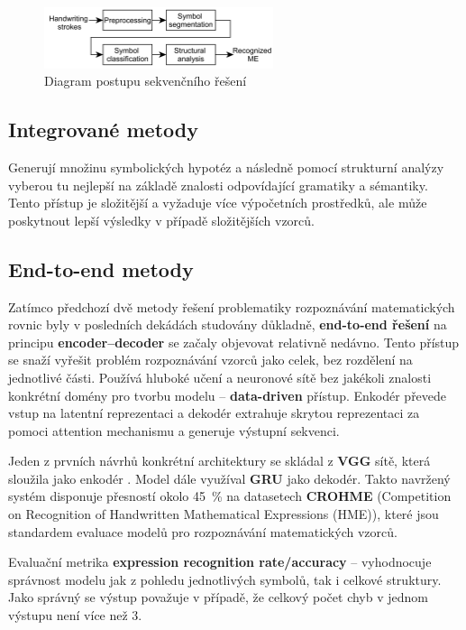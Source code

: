 \begin{figure}[H]
    \centering
    \includegraphics[width=0.6\textwidth]{img/sequential_sol.png}
    \caption{Diagram postupu sekvenčního řešení}
    \label{img:seq_sol}
\end{figure}

\subsection{Integrované metody}
Generují množinu symbolických hypotéz a následně pomocí strukturní analýzy vyberou tu nejlepší na základě znalosti odpovídající gramatiky a sémantiky. Tento přístup je složitější a vyžaduje více výpočetních prostředků, ale může poskytnout lepší výsledky v případě složitějších vzorců.

\subsection{End-to-end metody}
Zatímco předchozí dvě metody řešení problematiky rozpoznávání matematických rovnic byly v posledních dekádách studovány důkladně, \textbf{end-to-end řešení} na principu \textbf{encoder--decoder} se začaly objevovat relativně nedávno. Tento přístup se snaží vyřešit problém rozpoznávání vzorců jako celek, bez rozdělení na jednotlivé části. Používá hluboké učení a neuronové sítě bez jakékoli znalosti konkrétní domény pro tvorbu modelu -- \textbf{data-driven} přístup. Enkodér převede vstup na latentní reprezentaci a dekodér extrahuje skrytou reprezentaci za pomoci attention mechanismu a generuje výstupní sekvenci. 

Jeden z prvních návrhů konkrétní architektury se skládal z \textbf{VGG} sítě, která sloužila jako enkodér \cite{ZHANG_1}. Model dále využíval \textbf{GRU} jako dekodér. Takto navržený systém disponuje přesností okolo 45~\% na datasetech \textbf{CROHME} (Competition on Recognition of Handwritten Mathematical Expressions (HME)), které jsou standardem evaluace modelů pro rozpoznávání matematických vzorců. 

\begin{tcolorbox}[myhighlight]
Evaluační metrika \textbf{expression recognition rate/accuracy} -- vyhodnocuje správnost modelu jak z pohledu jednotlivých symbolů, tak i celkové struktury. Jako správný se výstup považuje v případě, že celkový počet chyb v jednom výstupu není více než 3. 
\end{tcolorbox}

